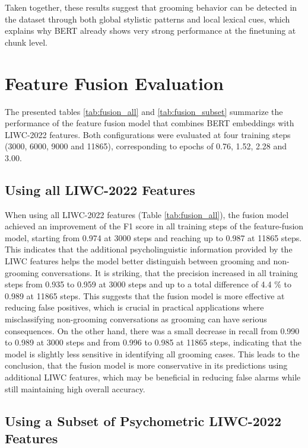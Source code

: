 Taken together, these results suggest that grooming behavior can be detected in the dataset through both global stylistic patterns and local lexical cues, which explains why BERT already shows very strong performance at the finetuning at chunk level.


\section{Feature Fusion Evaluation}




The presented tables \ref{tab:fusion_all} and \ref{tab:fusion_subset} summarize the performance of the feature fusion model that combines BERT embeddings with LIWC-2022 features. Both configurations were evaluated at four training steps (3000, 6000, 9000 and 11865), corresponding to epochs of 0.76, 1.52, 2.28 and 3.00.

\subsection{Using all LIWC-2022 Features}

When using all LIWC-2022 features (Table \ref{tab:fusion_all}), the fusion model achieved an improvement of the F1 score in all training steps of the feature-fusion model, starting from 0.974 at 3000 steps and reaching up to 0.987 at 11865 steps. This indicates that the additional psycholinguistic information provided by the LIWC features helps the model better distinguish between grooming and non-grooming conversations. It is striking, that the precision increased in all training steps from 0.935 to 0.959 at 3000 steps and up to a total difference of 4.4 \% to 0.989 at 11865 steps. This suggests that the fusion model is more effective at reducing false positives, which is crucial in practical applications where misclassifying non-grooming conversations as grooming can have serious consequences. On the other hand, there was a small decrease in recall from 0.990 to 0.989 at 3000 steps and from 0.996 to 0.985 at 11865 steps, indicating that the model is slightly less sensitive in identifying all grooming cases. This leads to the conclusion, that the fusion model is more conservative in its predictions using additional LIWC features, which may be beneficial in reducing false alarms while still maintaining high overall accuracy.


\subsection{Using a Subset of Psychometric LIWC-2022 Features}

